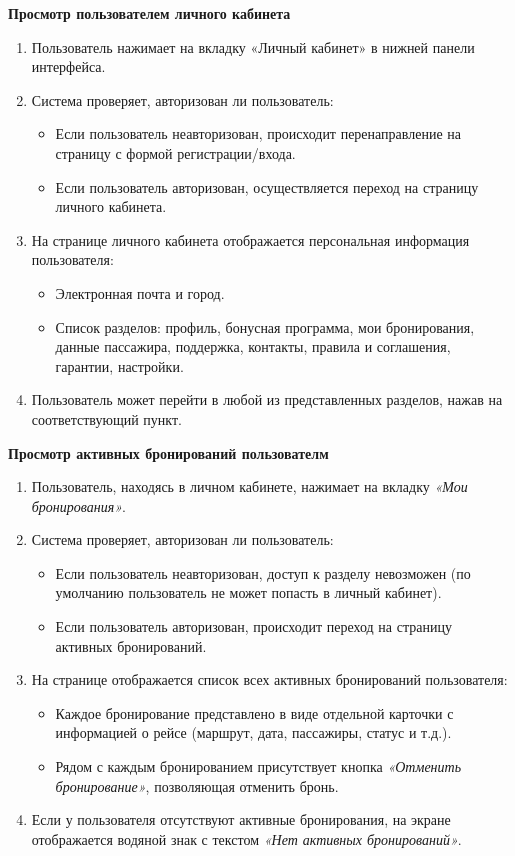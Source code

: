 \textbf{Просмотр пользователем личного кабинета}
\begin{enumerate}
    \item Пользователь нажимает на вкладку «Личный кабинет» в нижней панели интерфейса.
    \item Система проверяет, авторизован ли пользователь:
    \begin{itemize}
        \item Если пользователь неавторизован, происходит перенаправление на страницу с формой регистрации/входа.
        \item Если пользователь авторизован, осуществляется переход на страницу личного кабинета.
    \end{itemize}
    \item На странице личного кабинета отображается персональная информация пользователя:
    \begin{itemize}
        \item Электронная почта и город.
        \item Список разделов: профиль, бонусная программа, мои бронирования, данные пассажира, поддержка, контакты, правила и соглашения, гарантии, настройки.
    \end{itemize}
    \item Пользователь может перейти в любой из представленных разделов, нажав на соответствующий пункт.
\end{enumerate}

\textbf{Просмотр активных бронирований пользователм}
\begin{enumerate}
    \item Пользователь, находясь в личном кабинете, нажимает на вкладку \textit{«Мои бронирования»}.
    \item Система проверяет, авторизован ли пользователь:
    \begin{itemize}
        \item Если пользователь неавторизован, доступ к разделу невозможен (по умолчанию пользователь не может попасть в личный кабинет).
        \item Если пользователь авторизован, происходит переход на страницу активных бронирований.
    \end{itemize}
    \item На странице отображается список всех активных бронирований пользователя:
    \begin{itemize}
        \item Каждое бронирование представлено в виде отдельной карточки с информацией о рейсе (маршрут, дата, пассажиры, статус и т.д.).
        \item Рядом с каждым бронированием присутствует кнопка \textit{«Отменить бронирование»}, позволяющая отменить бронь.
    \end{itemize}
    \item Если у пользователя отсутствуют активные бронирования, на экране отображается водяной знак с текстом \textit{«Нет активных бронирований»}.
\end{enumerate}

